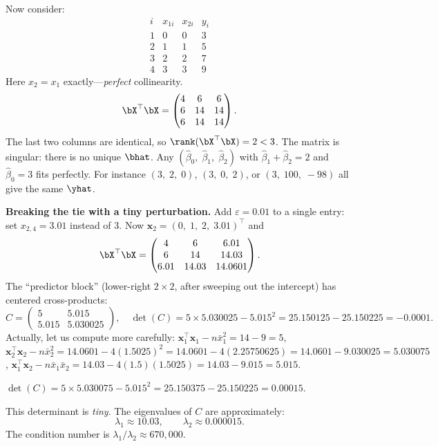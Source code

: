 \begin{example}
Now consider:
\[
\begin{array}{c|ccc}
i & x_{1i} & x_{2i} & y_i \\\hline
1 & 0 & 0 & 3 \\
2 & 1 & 1 & 5 \\
3 & 2 & 2 & 7 \\
4 & 3 & 3 & 9
\end{array}
\]
Here $x_2 = x_1$ exactly---\emph{perfect} collinearity.
\[
\bX^\top\bX = \begin{pmatrix}4&6&6\\6&14&14\\6&14&14\end{pmatrix}.
\]
The last two columns are identical, so $\rank(\bX^\top\bX) = 2 < 3$.
The matrix is singular: there is no unique $\bhat$.
Any $(\hat\beta_0,\;\hat\beta_1,\;\hat\beta_2)$ with $\hat\beta_1+\hat\beta_2 = 2$
and $\hat\beta_0 = 3$ fits perfectly.
For instance $(3,\;2,\;0)$, $(3,\;0,\;2)$, or $(3,\;100,\;-98)$ all give the same $\yhat$.

\medskip\noindent\textbf{Breaking the tie with a tiny perturbation.}
Add $\varepsilon = 0.01$ to a single entry: set $x_{2,4} = 3.01$ instead of $3$.
Now $\bm{x}_2 = (0,\;1,\;2,\;3.01)^\top$ and
\[
\bX^\top\bX = \begin{pmatrix}4&6&6.01\\6&14&14.03\\6.01&14.03&14.0601\end{pmatrix}.
\]
The ``predictor block'' (lower-right $2\times 2$, after sweeping out the intercept) has
centered cross-products:
\[
C = \begin{pmatrix} 5 & 5.015 \\ 5.015 & 5.030025 \end{pmatrix}, \quad
\det(C) = 5\times 5.030025 - 5.015^2 = 25.150125 - 25.150225 = -0.0001.
\]
Actually, let us compute more carefully:
$\bm{x}_1^\top\bm{x}_1 - n\bar{x}_1^2 = 14 - 9 = 5$,\;
$\bm{x}_2^\top\bm{x}_2 - n\bar{x}_2^2 = 14.0601 - 4(1.5025)^2 = 14.0601 - 4(2.25750625) = 14.0601 - 9.030025 = 5.030075$,\;
$\bm{x}_1^\top\bm{x}_2 - n\bar{x}_1\bar{x}_2 = 14.03 - 4(1.5)(1.5025) = 14.03 - 9.015 = 5.015$.

$\det(C) = 5 \times 5.030075 - 5.015^2 = 25.150375 - 25.150225 = 0.00015$.

This determinant is \emph{tiny}. The eigenvalues of $C$ are approximately:
\[
\lambda_1 \approx 10.03, \qquad \lambda_2 \approx 0.000015.
\]
The condition number is $\lambda_1/\lambda_2 \approx 670{,}000$.


\end{example}
